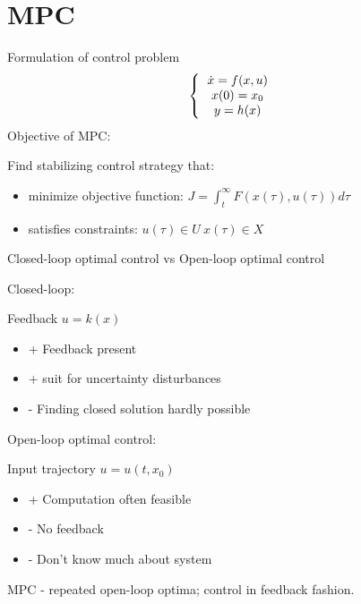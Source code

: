 \chapter{MPC}
Formulation of control problem
\begin{equation}
\left \{
  \begin{tabular}{c}
  $\dot x = f(x,u)$ \\
  $x(0) = x_0$ \\
  $y = h(x)$
  \end{tabular}
  \right. 
\end{equation}
Objective of MPC:

Find stabilizing control strategy that:
\begin{itemize}
\item minimize objective function: $J = \int_{t}^{\infty}F(x(\tau),u(\tau))d\tau$
\item satisfies constraints:
$u(\tau) \in U \  x(\tau) \in X$
\end{itemize}

Closed-loop optimal control vs Open-loop optimal control

Closed-loop:

Feedback $u=k(x)$ 
\begin{itemize}
\item + Feedback present
\item + suit for uncertainty disturbances
\item - Finding closed solution hardly possible
\end{itemize}

Open-loop optimal control:

Input trajectory $u = u(t, x_0)$
\begin{itemize}
\item + Computation often feasible
\item - No feedback
\item - Don't know much about system
\end{itemize}

MPC - repeated open-loop optima; control in feedback fashion.